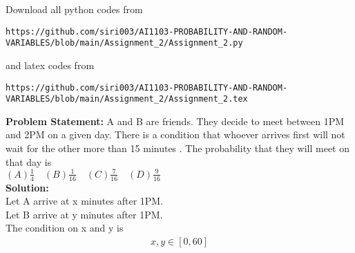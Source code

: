 \documentclass[journal,12pt,twocolumn]{IEEEtran}
\begin{document}
\maketitle
\newpage
\bigskip
\renewcommand{\thefigure}{\theenumi}
\renewcommand{\thetable}{\theenumi}
Download all python codes from 
\begin{lstlisting}
https://github.com/siri003/AI1103-PROBABILITY-AND-RANDOM-VARIABLES/blob/main/Assignment_2/Assignment_2.py
\end{lstlisting}
%
and latex codes from 
%
\begin{lstlisting}
https://github.com/siri003/AI1103-PROBABILITY-AND-RANDOM-VARIABLES/blob/main/Assignment_2/Assignment_2.tex
\end{lstlisting}
\textbf{Problem Statement:} A and B are friends. They decide to meet between 1PM and 2PM on a given day. There is a condition that whoever arrives first will not wait for the other more than 15 minutes . The probability that they will meet on that day is \newline
\\
$(A)\frac{1}{4} \quad (B)\frac{1}{16} \quad (C)\frac{7}{16} \quad (D)\frac{9}{16}$ 
\\
\textbf{Solution:}
\\
Let A arrive at x minutes after 1PM.
\\
Let B arrive at y minutes after 1PM.
\\
The condition on x and y is 
\begin{align}
    x,y \in [0,60]
    \label{eq:eq1}
\end{align}
\end{document}
